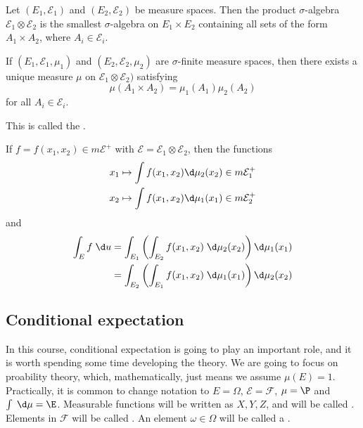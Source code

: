 \documentclass[a4paper]{article}
\begin{document}
\begin{defi}
  Let $(E_1, \mathcal{E}_1)$ and $(E_2 , \mathcal{E}_2)$ be measure spaces. Then the product $\sigma$-algebra$ \mathcal{E}_1 \otimes \mathcal{E}_2$ is the smallest $\sigma$-algebra on $E_1 \times E_2$ containing all sets of the form $A_1 \times A_2$, where $A_i \in \mathcal{E}_i$.
\end{defi}

\begin{thm}
  If $(E_1, \mathcal{E}_1, \mu_1)$ and $(E_2, \mathcal{E}_2, \mu_2)$ are $\sigma$-finite measure spaces, then there exists a unique measure $\mu$ on $\mathcal{E}_1 \otimes \mathcal{E}_2)$ satisfying
  \[
    \mu(A_1 \times A_2) = \mu_1(A_1) \mu_2(A_2)
  \]
  for all $A_i \in \mathcal{E}_i$.

  This is called the .
\end{thm}

\begin{thm}
  If $f = f(x_1, x_2) \in m\mathcal{E}^+$ with $\mathcal{E} = \mathcal{E}_1 \otimes \mathcal{E}_2$, then the functions
  \begin{align*}
    x_1 \mapsto \int f(x_1, x_2) \d \mu_2(x_2) \in m \mathcal{E}_1^+\\
    x_2 \mapsto \int f(x_1, x_2) \d \mu_1(x_1) \in m \mathcal{E}_2^+
  \end{align*}
  and
  \begin{align*}
    \int_E f \;\d u &= \int_{E_1} \left(\int_{E_2} f(x_1, x_2)\;\d \mu_2(x_2)\right) \d \mu_1(x_1)\\
    &= \int_{E_2} \left(\int_{E_1} f(x_1, x_2)\;\d \mu_1(x_1)\right) \d \mu_2(x_2)
  \end{align*}
\end{thm}
\subsection{Conditional expectation}
In this course, conditional expectation is going to play an important role, and it is worth spending some time developing the theory. We are going to focus on proability theory, which, mathematically, just means we assume $\mu(E) = 1$. Practically, it is common to change notation to $E = \Omega$, $\mathcal{E} = \mathcal{F}$, $\mu = \P$ and $\int\;\d \mu = \E$. Measurable functions will be written as $X, Y, Z$, and will be called . Elements in $\mathcal{F}$ will be called . An element $\omega \in \Omega$ will be called a .
\end{document}
